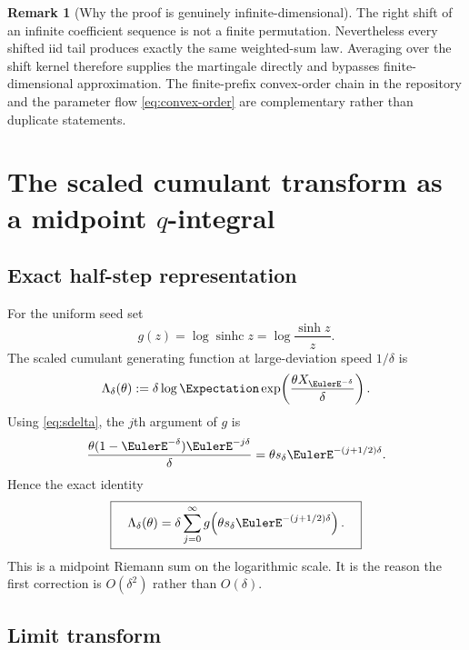 \documentclass[11pt,a4paper]{article}
\theoremstyle{definition}
\newtheorem{remark}[theorem]{Remark}
\newcommand{\sinhc}{\operatorname{sinhc}}
\begin{document}
\begin{remark}[Why the proof is genuinely infinite-dimensional]
The right shift of an infinite coefficient sequence is not a finite
permutation.  Nevertheless every shifted iid tail produces exactly the same
weighted-sum law.  Averaging over the shift kernel therefore supplies the
martingale directly and bypasses finite-dimensional approximation.  The
finite-prefix convex-order chain in the repository and the parameter flow
\eqref{eq:convex-order} are complementary rather than duplicate statements.
\end{remark}

\section{The scaled cumulant transform as a midpoint \texorpdfstring{$q$}{q}-integral}
\label{sec:midpoint}

\subsection{Exact half-step representation}

For the uniform seed set
\begin{equation}
 g(z)=\log\sinhc z=\log\frac{\sinh z}{z}.
 \label{eq:gdef}
\end{equation}
The scaled cumulant generating function at large-deviation speed
$1/\delta$ is
\begin{equation}
 \Lambda_\delta(\theta)
 :=\delta\log\Expectation\exp\!\left(\frac{\theta X_{\EulerE^{-\delta}}}{\delta}\right).
 \label{eq:scaled-cgf}
\end{equation}
Using \eqref{eq:sdelta}, the $j$th argument of $g$ is
\[
 \frac{\theta(1-\EulerE^{-\delta})\EulerE^{-j\delta}}{\delta}
 =\theta s_\delta \EulerE^{-(j+1/2)\delta}.
\]
Hence the exact identity
\begin{equation}
 \boxed{\quad
 \Lambda_\delta(\theta)
 =\delta\sum_{j=0}^{\infty}
 g\!\left(\theta s_\delta \EulerE^{-(j+1/2)\delta}\right).
 \quad}
 \label{eq:midpoint-sum}
\end{equation}
This is a midpoint Riemann sum on the logarithmic scale.  It is the reason the
first correction is $O(\delta^2)$ rather than $O(\delta)$.

\subsection{Limit transform}
\end{document}

